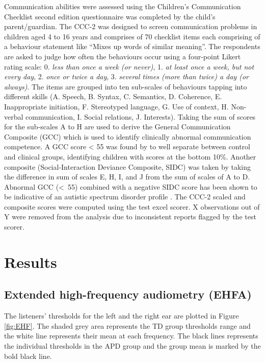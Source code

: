 \documentclass[a4paper, twoside]{templates/ociamthesis}
\begin{document}
Communication abilities were assessed using the Children's Communication Checklist second edition questionnaire \autocite[CCC-2;][]{D.V.M.2003} was completed by the child's parent/guardian. The CCC-2 was designed to screen communication problems in children aged 4 to 16 years and comprises of 70 checklist items each comprising of a behaviour statement like ``Mixes up words of similar meaning''. The respondents are asked to judge how often the behaviours occur using a four-point Likert rating scale: 0. \emph{less than once a week (or never)}, 1. \emph{at least once a week, but not every day}, 2. \emph{once or twice a day}, 3. \emph{several times (more than twice) a day (or always)}. The items are grouped into ten sub-scales of behaviours tapping into different skills (A. Speech, B. Syntax, C. Semantics, D. Coherence, E. Inappropriate initiation, F. Stereotyped language, G. Use of context, H. Non-verbal communication, I. Social relations, J. Interests). Taking the sum of scores for the sub-scales A to H are used to derive the General Communication Composite (GCC) which is used to identify clinically abnormal communication competence. A GCC score \textless{} 55 was found by \textcite{Norbury2005} to well separate between control and clinical groups, identifying children with scores at the bottom 10\%. Another composite (Social-Interaction Deviance Composite, SIDC) was taken by taking the difference in sum of scales E, H, I, and J from the sum of scales of A to D. Abnormal GCC (\textless~55) combined with a negative SIDC score has been shown to be indicative of an autistic spectrum disorder profile \autocite{D.V.M.2003}. The CCC-2 scaled and composite scores were computed using the test excel scorer. X observations out of Y were removed from the analysis due to inconsistent reports flagged by the test scorer.

\hypertarget{results-3}{%
\section{Results}\label{results-3}}

\hypertarget{extended-high-frequency-audiometry-ehfa-1}{%
\subsection{Extended high-frequency audiometry (EHFA)}\label{extended-high-frequency-audiometry-ehfa-1}}

The listeners' thresholds for the left and the right ear are plotted in Figure \ref{fig:EHF}. The shaded grey area represents the TD group thresholds range and the white line represents their mean at each frequency. The black lines represents the individual thresholds in the APD group and the group mean is marked by the bold black line.
\end{document}
